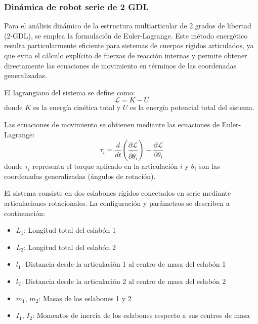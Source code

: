 \subsubsection{Dinámica de robot serie de 2 GDL}
Para el análisis dinámico de la estructura multiarticular de 2 grados de libertad (2-GDL), se emplea la formulación de Euler-Lagrange. Este método energético resulta particularmente eficiente para sistemas de cuerpos rígidos articulados, ya que evita el cálculo explícito de fuerzas de reacción internas y permite obtener directamente las ecuaciones de movimiento en términos de las coordenadas generalizadas.

El lagrangiano del sistema se define como:
\begin{equation}
\mathcal{L} = K - U
\end{equation}
donde $K$ es la energía cinética total y $U$ es la energía potencial total del sistema.

Las ecuaciones de movimiento se obtienen mediante las ecuaciones de Euler-Lagrange:
\begin{equation}
\tau_i = \frac{d}{dt}\left(\frac{\partial \mathcal{L}}{\partial \dot{\theta}_i}\right) - \frac{\partial \mathcal{L}}{\partial \theta_i}
\end{equation}
donde $\tau_i$ representa el torque aplicado en la articulación $i$ y $\theta_i$ son las coordenadas generalizadas (ángulos de rotación).


El sistema consiste en dos eslabones rígidos conectados en serie mediante articulaciones rotacionales. La configuración y parámetros se describen a continuación:
\begin{itemize}[label=$\bullet$]
    \item $L_1$: Longitud total del eslabón 1
    \item $L_2$: Longitud total del eslabón 2
    \item $l_1$: Distancia desde la articulación 1 al centro de masa del eslabón 1
    \item $l_2$: Distancia desde la articulación 2 al centro de masa del eslabón 2
    \item $m_1$, $m_2$: Masas de los eslabones 1 y 2
    \item $I_1$, $I_2$: Momentos de inercia de los eslabones respecto a sus centros de masa
\end{itemize}

